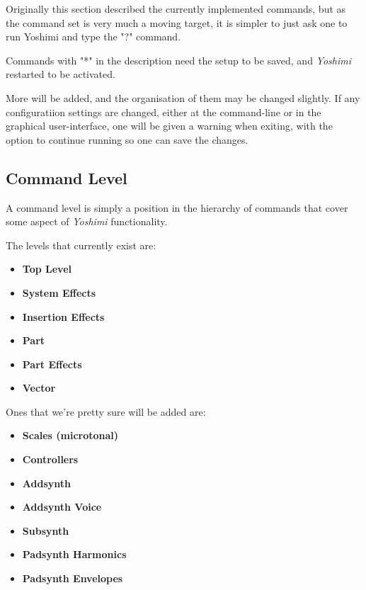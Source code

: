    Originally this section described the currently implemented commands,
   but as the command set is very much a moving target, it is simpler to just
   ask one to run Yoshimi and type the "?" command.

   Commands with "*" in the description need the setup to be saved,
   and \textsl{Yoshimi} restarted to be activated. 

   More will be added, and the organisation of them may be changed slightly.
   If any configuratiion settings are changed, either at the command-line
   or in the graphical user-interface, one will be given a warning when
   exiting, with the option to continue running so one can save the changes.

\subsection{Command Level}
\label{subsec:command_line_command_level}

   A command level is simply a position in the hierarchy of commands that cover
   some aspect of \textsl{Yoshimi} functionality.

   The levels that currently exist are:

   \begin{itemize}
      \item \textbf{Top Level}
      \item \textbf{System Effects}
      \item \textbf{Insertion Effects}
      \item \textbf{Part}
      \item \textbf{Part Effects}
      \item \textbf{Vector}
   \end{itemize}

Ones that we're pretty sure will be added are:

   \begin{itemize}
      \item \textbf{Scales (microtonal)}
      \item \textbf{Controllers}
      \item \textbf{Addsynth}
      \item \textbf{Addsynth Voice}
      \item \textbf{Subsynth}
      \item \textbf{Padsynth Harmonics}
      \item \textbf{Padsynth Envelopes}
   \end{itemize}

